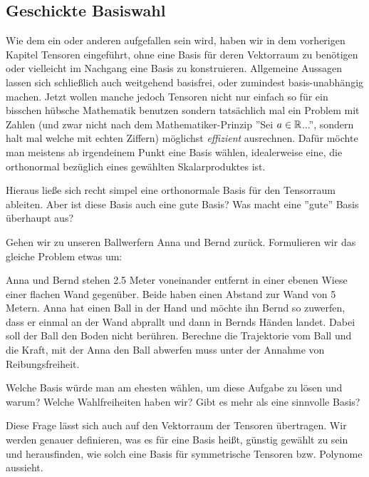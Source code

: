
\subsection{Geschickte Basiswahl}
Wie dem ein oder anderen aufgefallen sein wird, haben wir in dem vorherigen Kapitel Tensoren eingeführt, ohne eine Basis für deren Vektorraum zu benötigen oder vielleicht im Nachgang eine Basis zu konstruieren. Allgemeine Aussagen lassen sich schließlich auch weitgehend basisfrei, oder zumindest basis-unabhängig machen. 
Jetzt wollen manche jedoch Tensoren nicht nur einfach so für ein bisschen hübsche Mathematik benutzen sondern tatsächlich mal ein Problem mit Zahlen (und zwar nicht nach dem Mathematiker-Prinzip ''Sei $a\in \mathbb{R}$...'', sondern halt mal welche mit echten Ziffern) möglichst \emph{effizient} ausrechnen. Dafür möchte man meistens ab irgendeinem Punkt eine Basis wählen, idealerweise eine, die orthonormal bezüglich eines gewählten Skalarproduktes ist. 

\medbreak
 Hieraus ließe sich recht simpel eine orthonormale Basis für den Tensorraum ableiten. Aber ist diese Basis auch eine gute Basis? Was macht eine ''gute'' Basis überhaupt aus?

\medbreak
Gehen wir zu unseren Ballwerfern Anna und Bernd zurück. Formulieren wir das gleiche Problem etwas um:

\begin{gridmp}{\linewidth}
	{\selectfont
	Anna und Bernd stehen 2.5 Meter voneinander entfernt in einer ebenen Wiese einer flachen Wand gegenüber. Beide haben einen Abstand zur Wand von 5 Metern. Anna hat einen Ball in der Hand und möchte ihn Bernd so zuwerfen, dass er einmal an der Wand abprallt und dann in Bernds Händen landet. Dabei soll der Ball den Boden nicht berühren. Berechne die Trajektorie vom Ball und die Kraft, mit der Anna den Ball abwerfen muss unter der Annahme von Reibungsfreiheit.}
	\vspace{8cm}
\end{gridmp}

Welche Basis würde man am ehesten wählen, um diese Aufgabe zu lösen und warum? Welche Wahlfreiheiten haben wir? Gibt es mehr als eine sinnvolle Basis?


Diese Frage lässt sich auch auf den Vektorraum der Tensoren übertragen. Wir werden genauer definieren, was es für eine Basis heißt, günstig gewählt zu sein und herausfinden, wie solch eine Basis für symmetrische Tensoren bzw. Polynome aussieht.

